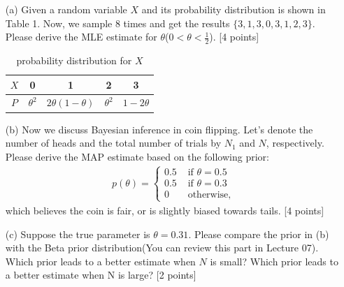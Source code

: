 \documentclass[10pt]{article}
\begin{document}
\begin{enumerate}
    \item[(a)] 
    Given a random variable $X$ and its probability distribution is shown in Table 1. Now, we sample 8 times and get the results $\{3,1,3,0,3,1,2,3\}$. Please derive the MLE estimate for $\theta$($0 < \theta < \frac{1}{2}$). {\color{red} [4 points]} \\
    \begin{table}[t]
      \caption{probability distribution for $X$}
      \label{table1}
      \centering
      \begin{tabular}{c|c|c|c|c}
        \hline
        $X$ & 0 & 1 & 2 & 3 \\ \hline
        $P$ & $\theta^{2}$ & $2\theta(1-\theta)$ & $\theta^{2}$ & $1-2\theta$ \\
        \hline
      \end{tabular}
    \end{table}
    
    \item[(b)]
    Now we discuss Bayesian inference in coin flipping. Let's denote the number of heads and the total number of trials by $N_1$ and $N$, respectively. Please derive the MAP estimate based on the following prior:
    \begin{align*}
        p(\theta)=\left\{\begin{array}{ll}
        0.5 & \text { if } \theta=0.5 \\
        0.5 & \text { if } \theta=0.3 \\
        0   & \text { otherwise,}
        \end{array}\right.
    \end{align*}
    which believes the coin is fair, or is slightly biased towards tails. {\color{red} [4 points]} \\
    
    \item[(c)]
    Suppose the true parameter is $\theta = 0.31$. Please compare the prior in (b) with the Beta prior distribution(You can review this part in Lecture 07). Which prior leads to a better estimate when $N$ is small? Which prior leads to a better estimate when N is large? {\color{red} [2 points]} \\

\end{enumerate}
\newpage
\end{document}
